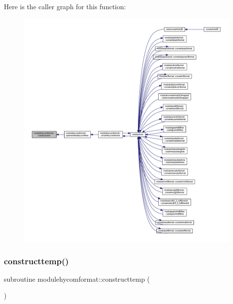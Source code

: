 Here is the caller graph for this function\+:\nopagebreak
\begin{figure}[H]
\begin{center}
\leavevmode
\includegraphics[width=350pt]{namespacemodulehycomformat_accd71877c333ad8cebf0e4bd5b0f16d1_icgraph}
\end{center}
\end{figure}
\mbox{\label{namespacemodulehycomformat_a9e994c5d27c453fa808543d635fb116e}} 
\subsubsection{\texorpdfstring{constructtemp()}{constructtemp()}}
{\footnotesize\ttfamily subroutine modulehycomformat\+::constructtemp (\begin{DoxyParamCaption}{ }\end{DoxyParamCaption})\hspace{0.3cm}{\ttfamily [private]}}

